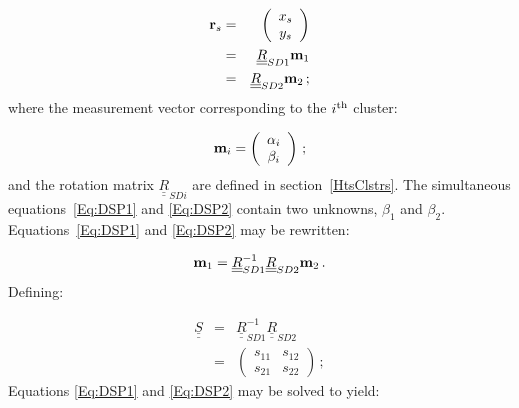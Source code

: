 \begin{eqnarray}
  {\bf r}_s & = & \left( 
                      \begin{array}{c}
                        x_s \\ y_s
                      \end{array}
                     \right)                                  \\
               & = & \underline{\underline{R}}_{SD1} {\bf m}_1 
                                              \label{Eq:DSP1} \\
               & = & \underline{\underline{R}}_{SD2} {\bf m}_2 
                                              \label{Eq:DSP2} \, ;
\end{eqnarray}
where the measurement vector corresponding to the $i^{\rm th}$ cluster: 

\begin{equation}
  {\bf m}_i = \left( 
               \begin{array}{c}
                 \alpha_i \\ \beta_i
               \end{array}
              \right) \, ;
\end{equation}
and the rotation matrix $\underline{\underline{R}}_{SDi}$ are defined in section~\ref{HtsClstrs}. The simultaneous equations~\ref{Eq:DSP1} and \ref{Eq:DSP2} contain two unknowns, $\beta_1$ and $\beta_2$. Equations~\ref{Eq:DSP1} and \ref{Eq:DSP2} may be rewritten:

\begin{equation}
  {\bf m}_1 = \underline{\underline{R}}_{SD1}^{-1}
              \underline{\underline{R}}_{SD2} {\bf m}_2 \, .
\end{equation}
Defining:

\begin{eqnarray}
  \underline{\underline{S}} & = & \underline{\underline{R}}_{SD1}^{-1}
                                  \underline{\underline{R}}_{SD2}     \\
                            & = & \left( 
                                    \begin{array}{cc}
                                      s_{11} & s_{12} \\
                                      s_{21} & s_{22}
                                    \end{array}
                                   \right) \, ;
\end{eqnarray}
Equations \ref{Eq:DSP1} and \ref{Eq:DSP2} may be solved to yield:

